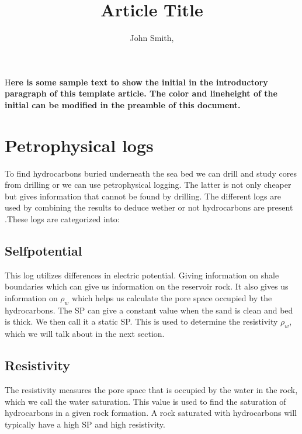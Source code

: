 \documentclass[DIV=calc, paper=a4, fontsize=11pt, twocolumn]{scrartcl}	 %
\title{Article Title} %
\author{John Smith, } %
\date{} %
\newcommand{\initial}[1]{ %
\lettrine[lines=3,lhang=0.3,nindent=0em]{
\color{DarkGoldenrod}
{\textsf{#1}}}{}}
\begin{document}
\maketitle %

\thispagestyle{fancy} %


\initial{H}\textbf{ere is some sample text to show the initial in the introductory paragraph of this template article. The color and lineheight of the initial can be modified in the preamble of this document.}







\section*{Petrophysical logs}
To find hydrocarbons buried underneath the sea bed we can drill and study cores from drilling or we can use petrophysical logging. The latter is not only cheaper but gives information that cannot be found by drilling. The different logs are used by combining the results to deduce wether or not hydrocarbons are present .These logs are categorized into:
\subsection*{Selfpotential}
This log utilizes differences in electric potential. Giving information on shale boundaries which can give us information on the reservoir rock. It also gives us information on $\rho_w$ which helps us calculate the pore space occupied by the hydrocarbons. The SP can give a constant value when the sand is clean and bed is thick. We then call it a static SP. This is used to determine the resistivity  $\rho_w$, which we will talk about in the next section.
\subsection*{Resistivity}
The resistivity measures the pore space that is occupied by the water in the rock, which we call the water saturation. This value is used to find the saturation of hydrocarbons in a given rock formation. A rock saturated with hydrocarbons will typically have a high SP and high resistivity.
\end{document}
